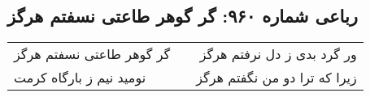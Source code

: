\begin{center}
\section*{رباعی شماره ۹۶۰: گر گوهر طاعتی نسفتم هرگز}
\label{sec:0960}
\begin{longtable}{l p{0.5cm} r}
گر گوهر طاعتی نسفتم هرگز
&&
ور گرد بدی ز دل نرفتم هرگز
\\
نومید نیم ز بارگاه کرمت
&&
زیرا که ترا دو من نگفتم هرگز
\\
\end{longtable}
\end{center}
